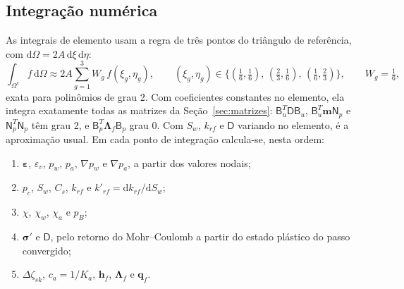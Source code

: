 \documentclass[11pt,a4paper]{article}
\newcommand{\vq}{\bm q}
\newcommand{\tsig}{\bm\sigma}
\newcommand{\teps}{\bm\varepsilon}
\newcommand{\mt}[1]{\mathsf{#1}}
\newcommand{\dd}{\mathrm d}
\begin{document}
\subsection{Integração numérica}
\label{sec:quadratura}
As integrais de elemento usam a regra de três pontos do triângulo de referência, com
$\dd\Omega=2A\,\dd\xi\,\dd\eta$:
\begin{equation}
\int_{\Omega^e}f\,\dd\Omega\approx2A\sum_{g=1}^{3}W_g\,f(\xi_g,\eta_g),\qquad
(\xi_g,\eta_g)\in\big\{(\tfrac16,\tfrac16),\,(\tfrac23,\tfrac16),\,(\tfrac16,\tfrac23)\big\},\qquad
W_g=\tfrac16 ,
\label{eq:quadratura}
\end{equation}
exata para polinômios de grau 2. Com coeficientes constantes no elemento, ela integra
exatamente todas as matrizes da Seção~\ref{sec:matrizes}: $\mt B_u^T\mt D\mt B_u$,
$\mt B_u^T\bm m\mt N_p$ e $\mt N_p^T\mt N_p$ têm grau 2, e $\mt B_p^T\bm\Lambda_f\mt B_p$
grau 0. Com $S_w$, $k_{rf}$ e $\mt D$ variando no elemento, é a aproximação usual. Em cada
ponto de integração calcula-se, nesta ordem:
\begin{enumerate}[label=\arabic*.,leftmargin=*,itemsep=0pt]
\item $\teps$, $\varepsilon_v$, $p_w$, $p_a$, $\nabla p_w$ e $\nabla p_a$, a partir dos valores nodais;
\item $p_c$, $S_w$, $C_s$, $k_{rf}$ e $k'_{rf}=\dd k_{rf}/\dd S_w$;
\item $\chi$, $\chi_w$, $\chi_a$ e $p_B$;
\item $\tsig'$ e $\mt D$, pelo retorno do Mohr--Coulomb a partir do estado plástico do passo
  convergido;
\item $\Delta\zeta_{sk}$, $c_a=1/K_a$, $\bm h_f$, $\bm\Lambda_f$ e $\vq_f$.
\end{enumerate}
\end{document}
